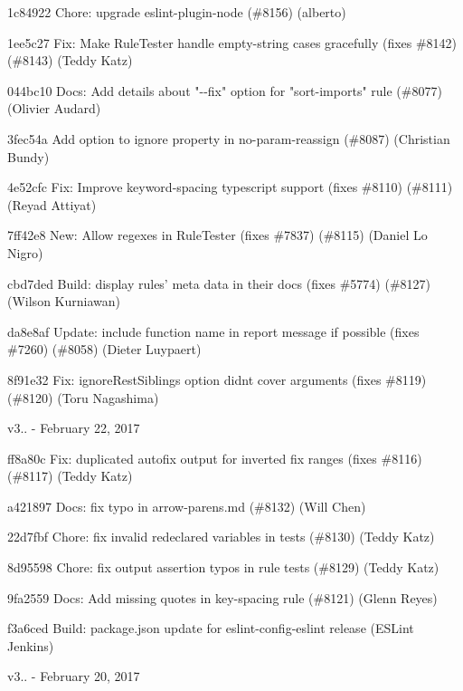 \begin{DoxyItemize}
\item 1c84922 Chore\+: upgrade eslint-\/plugin-\/node (\#8156) (alberto)
\item 1ee5c27 Fix\+: Make Rule\+Tester handle empty-\/string cases gracefully (fixes \#8142) (\#8143) (Teddy Katz)
\item 044bc10 Docs\+: Add details about "{}-\/-\/fix"{} option for "{}sort-\/imports"{} rule (\#8077) (Olivier Audard)
\item 3fec54a Add option to ignore property in no-\/param-\/reassign (\#8087) (Christian Bundy)
\item 4e52cfc Fix\+: Improve keyword-\/spacing typescript support (fixes \#8110) (\#8111) (Reyad Attiyat)
\item 7ff42e8 New\+: Allow regexes in Rule\+Tester (fixes \#7837) (\#8115) (Daniel Lo Nigro)
\item cbd7ded Build\+: display rules’ meta data in their docs (fixes \#5774) (\#8127) (Wilson Kurniawan)
\item da8e8af Update\+: include function name in report message if possible (fixes \#7260) (\#8058) (Dieter Luypaert)
\item 8f91e32 Fix\+: {\ttfamily ignore\+Rest\+Siblings} option didn\textquotesingle{}t cover arguments (fixes \#8119) (\#8120) (Toru Nagashima)
\end{DoxyItemize}

v3.. -\/ February 22, 2017


\begin{DoxyItemize}
\item ff8a80c Fix\+: duplicated autofix output for inverted fix ranges (fixes \#8116) (\#8117) (Teddy Katz)
\item a421897 Docs\+: fix typo in arrow-\/parens.\+md (\#8132) (Will Chen)
\item 22d7fbf Chore\+: fix invalid redeclared variables in tests (\#8130) (Teddy Katz)
\item 8d95598 Chore\+: fix output assertion typos in rule tests (\#8129) (Teddy Katz)
\item 9fa2559 Docs\+: Add missing quotes in key-\/spacing rule (\#8121) (Glenn Reyes)
\item f3a6ced Build\+: package.\+json update for eslint-\/config-\/eslint release (ESLint Jenkins)
\end{DoxyItemize}

v3.. -\/ February 20, 2017


